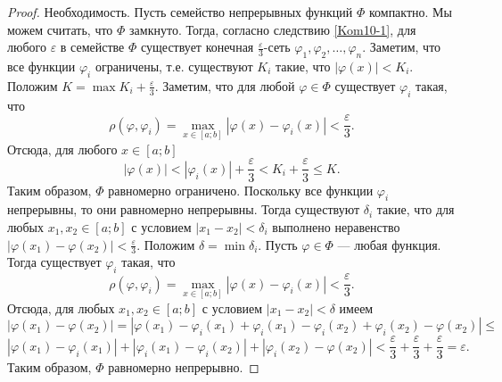 \documentclass[12pt, titlepage, oneside]{amsbook}
\theoremstyle{definition}
\theoremstyle{remark}
\begin{document}
\begin{proof}
	Необходимость. Пусть семейство непрерывных функций $\Phi$ компактно. Мы можем считать, что $\Phi$ замкнуто. Тогда, согласно следствию \ref{Kom10-1}, для любого $\varepsilon$ в семействе $\Phi$ существует конечная $\frac{\varepsilon}{3}$-сеть $\varphi_1,\varphi_2,\ldots,\varphi_n$. Заметим, что все функции $\varphi_i$ ограничены, т.е. существуют $K_i$ такие, что $|\varphi(x)|<K_i$. Положим $K=\max K_i+\frac{\varepsilon}{3}$. Заметим, что для любой $\varphi\in\Phi$ существует $\varphi_i$ такая, что $$\rho(\varphi,\varphi_i)=\max\limits_{x\in[a;b]}|\varphi(x)-\varphi_i(x)|<\frac{\varepsilon}{3}.$$ Отсюда, для любого $x\in[a;b]$ $$|\varphi(x)|<|\varphi_i(x)|+\frac{\varepsilon}{3}<K_i+\frac{\varepsilon}{3}\leq K.$$ Таким образом, $\Phi$ равномерно ограничено. Поскольку все функции $\varphi_i$ непрерывны, то они равномерно непрерывны. Тогда существуют $\delta_i$ такие, что для любых $x_1,x_2\in[a;b]$ с условием $|x_1-x_2|<\delta_i$ выполнено неравенство $|\varphi(x_1)-\varphi(x_2)|<\frac{\varepsilon}{3}$. Положим $\delta=\min\delta_i$. Пусть $\varphi\in\Phi$ --- любая функция. Тогда существует $\varphi_i$ такая, что $$\rho(\varphi,\varphi_i)=\max\limits_{x\in[a;b]}|\varphi(x)-\varphi_i(x)|<\frac{\varepsilon}{3}.$$ Отсюда, для любых $x_1,x_2\in[a;b]$ с условием $|x_1-x_2|<\delta$ имеем $$|\varphi(x_1)-\varphi(x_2)|=|\varphi(x_1)-\varphi_i(x_1)+\varphi_i(x_1)-\varphi_i(x_2)+\varphi_i(x_2)-\varphi(x_2)|\leq$$ $$|\varphi(x_1)-\varphi_i(x_1)|+|\varphi_i(x_1)-\varphi_i(x_2)|+|\varphi_i(x_2)-\varphi(x_2)|<\frac{\varepsilon}{3}+\frac{\varepsilon}{3}+\frac{\varepsilon}{3}=\varepsilon.$$ Таким образом, $\Phi$ равномерно непрерывно.
	

\end{proof}
\end{document}
